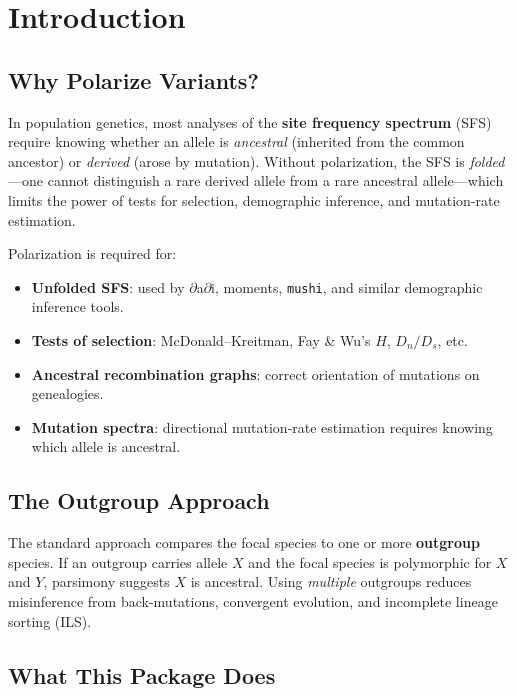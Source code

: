 \documentclass[11pt,a4paper]{article}
\begin{document}
\section{Introduction}
\label{sec:intro}

\subsection{Why Polarize Variants?}

In population genetics, most analyses of the \textbf{site frequency spectrum} (SFS) require knowing whether an allele is \emph{ancestral} (inherited from the common ancestor) or \emph{derived} (arose by mutation).  Without polarization, the SFS is \emph{folded}---one cannot distinguish a rare derived allele from a rare ancestral allele---which limits the power of tests for selection, demographic inference, and mutation-rate estimation.

Polarization is required for:
\begin{itemize}[leftmargin=2em]
    \item \textbf{Unfolded SFS}: used by $\partial$a$\partial$i, moments, \texttt{mushi}, and similar demographic inference tools.
    \item \textbf{Tests of selection}: McDonald--Kreitman, Fay \& Wu's $H$, $D_n/D_s$, etc.
    \item \textbf{Ancestral recombination graphs}: correct orientation of mutations on genealogies.
    \item \textbf{Mutation spectra}: directional mutation-rate estimation requires knowing which allele is ancestral.
\end{itemize}

\subsection{The Outgroup Approach}

The standard approach compares the focal species to one or more \textbf{outgroup} species.  If an outgroup carries allele $X$ and the focal species is polymorphic for $X$ and $Y$, parsimony suggests $X$ is ancestral.  Using \emph{multiple} outgroups reduces misinference from back-mutations, convergent evolution, and incomplete lineage sorting (ILS).

\subsection{What This Package Does}
\end{document}
